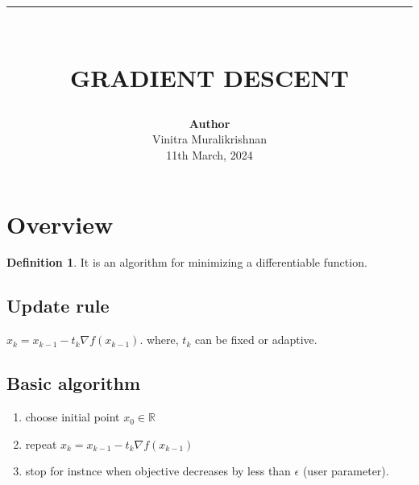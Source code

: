 \documentclass{article}
\newcommand{\HRule}[1]{\rule{\linewidth}{#1}}
\theoremstyle{definition}
\newtheorem{definition}{Definition}[section]
\theoremstyle{remark}
\def\R{\mathbb{R}}
\begin{document}

\title{ \normalsize \textsc{}
		\\ [2.0cm]
		\HRule{1.5pt} \\
		\LARGE \textbf{\uppercase{Gradient Descent}
        \vspace*{10\baselineskip}}
		}
\date{}
\author{\textbf{Author} \\ 
		Vinitra Muralikrishnan \\
		11th March, 2024}

\maketitle
\newpage

\tableofcontents
\newpage


\section{Overview}

\begin{definition}
    It is an algorithm for minimizing a differentiable function.
\end{definition}

\subsection{Update rule}
$x_k = x_{k-1} - t_k \nabla f(x_{k-1})$.
where, $t_k$ can be fixed or adaptive.\\

\subsection{Basic algorithm}
\begin{enumerate}
    \item{}choose initial point $x_0 \in \R$
    \item{}repeat $x_k = x_{k-1} - t_k \nabla f(x_{k-1})$
    \item{} stop for instnce when objective decreases by less than $\epsilon$ (user parameter).
\end{enumerate}
\end{document}
